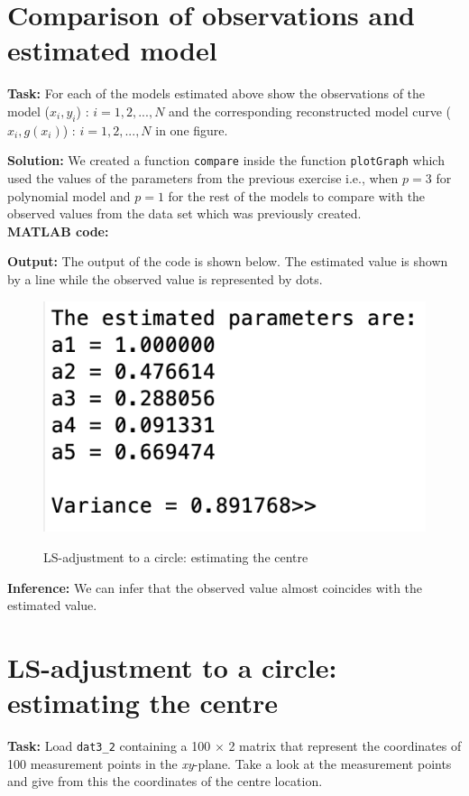 \section{Comparison of observations and estimated model}  \label{Comparison of observations and estimated model}
\noindent \textbf{Task:} For each of the models estimated above show the observations of the model ($x_i, y_i$) : $i = 1,2,...,N$ and the corresponding reconstructed model curve ($x_i, g(x_i)$) : $i = 1,2,...,N$ in one figure.
 
 \noindent \textbf{Solution:} We created a function \texttt{compare} inside the function \texttt{plotGraph} which used the values of the parameters from the previous exercise i.e., when $p = 3$ for polynomial model and $p = 1$ for the rest of the models to compare with the observed values from the data set which was previously created.\\
 
 \noindent \textbf{MATLAB code:}


 \noindent \textbf{Output:}
 \noindent The output of the code is shown below. The estimated value is shown by a line while the observed value is represented by dots.
\begin{figure}[H]
\centering
{\includegraphics[scale=0.15]{ass5_1.png}}
\caption{LS-adjustment to a circle: estimating the centre }
\label{LS-adjustment to a circle: estimating the centre }
\end{figure}


\noindent \textbf{Inference:} We can infer that the observed value almost coincides with the estimated value. 


\section{ LS-adjustment to a circle: estimating the centre  }  \label{ LS-adjustment to a circle: estimating the centre }
\noindent \textbf{Task:} Load \texttt{dat3\_2} containing a 100 $\times$ 2 matrix that represent the coordinates of 100 measurement points in the \textit{xy}-plane. Take a look at the measurement points and give from this the coordinates of the centre location. 


